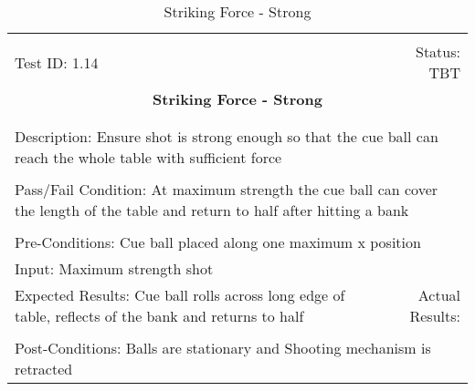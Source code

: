 \documentclass[titlepage]{article}
\begin{document}
\begin{center}%
\begin{table}[h!]
\begin{tabular}{|l r|}\hline&\\[-2mm]
	Test ID: 1.14	&Status: TBT\\[-3mm]
	\multicolumn{2}{|c|}{\textbf{\large{Striking Force - Strong}}}\\&\\\hline&\\[-3mm]
	\multicolumn{2}{|p{\textwidth}|}{Description: Ensure shot is strong enough so that the cue ball can reach the whole table with sufficient force}\\[1mm]\hline&\\[-3mm]
	\multicolumn{2}{|p{\textwidth}|}{Pass/Fail Condition: At maximum strength the cue ball can cover the length of the table and return to half after hitting a bank}\\[1mm]\hline&\\[-3mm]
	\multicolumn{2}{|p{\textwidth}|}{Pre-Conditions: Cue ball placed along one maximum x position}\\[4mm]
	\multicolumn{2}{|p{\textwidth}|}{Input: Maximum strength shot}\\[2mm]\hline
	\multicolumn{1}{|p{0.49\textwidth}}{Expected Results: Cue ball rolls across long edge of table, reflects of the bank and returns to half}	&\multicolumn{1}{|p{0.45\textwidth}|}{Actual Results:}\\\hline&\\[-3mm]
	\multicolumn{2}{|p{\textwidth}|}{Post-Conditions: Balls are stationary and Shooting mechanism is retracted}\\\hline
\end{tabular}
\caption{Striking Force - Strong}
\end{table}
\end{center}
\end{document}

